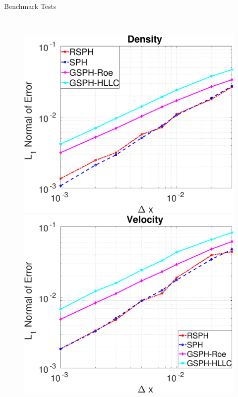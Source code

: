 \documentclass{beamer}
\begin{document}
\begin{frame}{Benchmark Tests}
{\begin{minipage}{.3\textwidth}
    \end{minipage}}
    \\
\begin{figure}
    \centering
    \begin{minipage}{.3\textwidth}
        \centering
        \includegraphics[width=0.95 \textwidth]{./Chapter-4/Figures/Accuracy-des}
    \end{minipage}%
    \begin{minipage}{.3 \textwidth}
        \centering
        \includegraphics[width=0.95 \textwidth]{./Chapter-4/Figures/Accuracy-vel}
    \end{minipage}%

\end{figure}
\end{frame}
\end{document}
